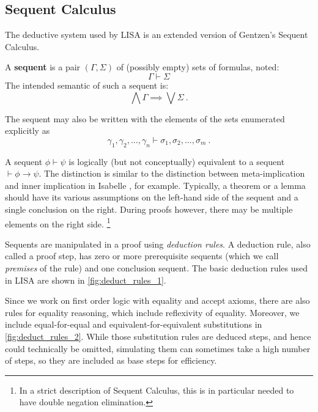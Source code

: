 \subsection{Sequent Calculus}
\label{subsec:lk}
The deductive system used by LISA is an extended version of Gentzen's Sequent Calculus.
\begin{defin}
  A \textbf{sequent} is a pair $(\Gamma, \Sigma)$ of (possibly empty) sets of formulas, noted:
  $$\Gamma \vdash \Sigma$$
  The intended semantic of such a sequent is:
  \begin{equation*}
    \label{eq:SequentSemantic}
    \bigwedge \Gamma \implies \bigvee \Sigma~.
  \end{equation*}

  The sequent may also be written with the elements of the sets enumerated explicitly as
  \begin{equation*}
    \gamma_1, \gamma_2, \ldots, \gamma_n \vdash \sigma_1, \sigma_2, \ldots, \sigma_m~.
  \end{equation*}
\end{defin}
A sequent $\phi \vdash \psi$ is logically (but not conceptually) equivalent to a sequent $\vdash \phi \rightarrow \psi$. The distinction is similar to the distinction between meta-implication and inner implication in Isabelle \cite{paulson1993isabelle}, for example. Typically, a theorem or a lemma should have its various assumptions on the left-hand side of the sequent and a single conclusion on the right. During proofs however, there may be multiple elements on the right side. \footnote{In a strict description of Sequent Calculus, this is in particular needed to have double negation elimination.}

Sequents are manipulated in a proof using \emph{deduction rules}. A deduction rule, also called a proof step, has zero or more prerequisite sequents (which we call \emph{premises} of the rule) and one conclusion sequent. The basic deduction rules used in LISA are shown in \autoref{fig:deduct_rules_1}.

Since we work on first order logic with equality and accept axioms, there are also rules for equality reasoning, which include reflexivity of equality. Moreover, we include equal-for-equal and equivalent-for-equivalent substitutions in \autoref{fig:deduct_rules_2}. While those substitution rules are deduced steps, and hence could technically be omitted, simulating them can sometimes take a high number of steps, so they are included as base steps for efficiency.

